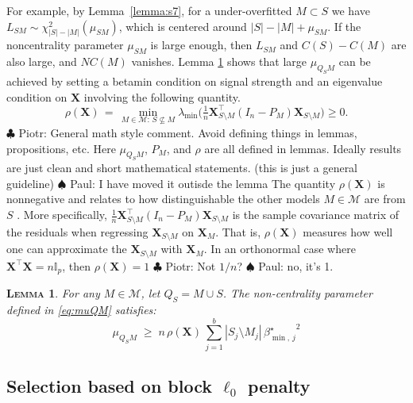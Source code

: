 \documentclass[aos]{imsart}
\theoremstyle{plain}
\newtheorem{lem}{\textsc{Lemma}}[section]
\newcommand{\piotr}[1]{{\small{\color{red} \sf $\clubsuit$ Piotr: #1}}}
\newcommand{\paul}[1]{{\small{\color{green} \sf $\spadesuit$ Paul: #1}}}
\newcommand{\I}{\mathbb{I}}
\newcommand{\bs}{\boldsymbol}
\begin{document}
For example, by Lemma~\ref{lemma:s7}, for a under-overfitted $M\subset S$ we have $L_{SM}\sim \chi^2_{|S|-|M|}(\mu_{SM})$, which is centered around $|S|-|M|+\mu_{SM}$.
If the noncentrality parameter $\mu_{SM}$ is large enough, then $L_{SM}$ and $C(S)-C(M)$ are also large, and $NC(M)$ vanishes. Lemma \ref{lem:boundrho} shows that large $\mu_{Q_SM}$ can be achieved by setting a betamin condition on signal strength and an eigenvalue condition on $\bs X$ involving the following quantity.  
 \begin{equation}\label{eq:rhoX}
        \rho(\bs X)\,=\,\min_{M \in \mathcal{M}:\, S \not \subseteq M} \lambda_{\min}\big(\tfrac{1}{n} \boldsymbol{X}_{S \setminus M}^{\top}\left(I_n- P_M\right) \boldsymbol{X}_{S \setminus M}\big) \geq 0.
    \end{equation}
\piotr{General math style comment. Avoid defining things in lemmas, propositions, etc. Here $\mu_{Q_SM}$, $P_M$, and $\rho$ are all defined in lemmas. Ideally results are just clean and short mathematical statements. (this is just a general guideline)} \paul{I have moved it outisde the lemma}
The quantity $\rho(\bs X)$ is nonnegative and relates to how distinguishable the other models $M\in \mathcal{M}$ are from $S$ \citep{infotheowainwright}.  More specifically, $\tfrac{1}{n} \boldsymbol{X}_{S \setminus M}^{\top}\left(I_n- P_M\right) \boldsymbol{X}_{S \setminus M}$ is the sample covariance matrix of the residuals when regressing $\boldsymbol{X}_{S \setminus M}$ on $\boldsymbol{X}_M$.
That is, $\rho(\bs X)$ measures how well one can approximate the 
$\boldsymbol{X}_{S \setminus M}$ with $\boldsymbol{X}_M$.
In an orthonormal case where $\bs X^{\top}\bs X=n\I_p$, then $\rho(\bs X)=1$\piotr{Not $1/n$?}\paul{no, it's 1}.  

\begin{lem}\label{lem:boundrho}
 For any $M\in\mathcal{M}$, let $Q_S=M \cup S$. The non-centrality parameter defined in \eqref{eq:muQM} satisfies: 
    \begin{equation}\label{eq:musmbound}
    \mu_{Q_SM}\; \geq \;n\,\rho(\bs X)\,\sum_{j=1}^b|S_j\setminus M_j|\,{\beta_{\min,\,j}^{\star}}^2
\end{equation}
\end{lem}



\subsection{Selection based on block $\ell_0$ penalty}
\label{ssec:regression_mainresult}
\end{document}
